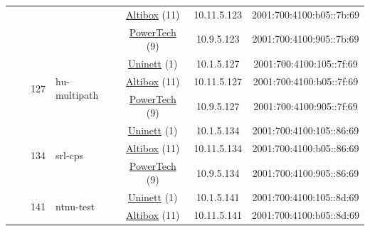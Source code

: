 \begin{small}
\begin{center}
\begin{longtable}{|c|c|c|c|c|c|c|c|}
  &  &  &  & \multicolumn{2}{|c|}{\tiny{\href{https://www.altibox.no}{Altibox} (11)}} & \tiny{10.11.5.123} & \tiny{2001:700:4100:b05::7b:69} \\* \cline{5-5}\cline{6-6}\cline{7-7}\cline{8-8}
  &  &  &  & \multicolumn{2}{|c|}{\tiny{\href{http://www.powertech.no}{PowerTech} (9)}} & \tiny{10.9.5.123} & \tiny{2001:700:4100:905::7b:69} \\* \cline{3-3}\cline{4-4}\cline{5-5}\cline{6-6}\cline{7-7}\cline{8-8}
  &  & \multirow{3}{*}{\tiny{127}} & \multicolumn{1}{|l|}{\multirow{3}{*}{\tiny{hu-multipath}}} & \multicolumn{2}{|c|}{\tiny{\href{https://www.uninett.no}{Uninett} (1)}} & \tiny{10.1.5.127} & \tiny{2001:700:4100:105::7f:69} \\* \cline{5-5}\cline{6-6}\cline{7-7}\cline{8-8}
  &  &  &  & \multicolumn{2}{|c|}{\tiny{\href{https://www.altibox.no}{Altibox} (11)}} & \tiny{10.11.5.127} & \tiny{2001:700:4100:b05::7f:69} \\* \cline{5-5}\cline{6-6}\cline{7-7}\cline{8-8}
  &  &  &  & \multicolumn{2}{|c|}{\tiny{\href{http://www.powertech.no}{PowerTech} (9)}} & \tiny{10.9.5.127} & \tiny{2001:700:4100:905::7f:69} \\* \cline{3-3}\cline{4-4}\cline{5-5}\cline{6-6}\cline{7-7}\cline{8-8}
  &  & \multirow{3}{*}{\tiny{134}} & \multicolumn{1}{|l|}{\multirow{3}{*}{\tiny{srl-cps}}} & \multicolumn{2}{|c|}{\tiny{\href{https://www.uninett.no}{Uninett} (1)}} & \tiny{10.1.5.134} & \tiny{2001:700:4100:105::86:69} \\* \cline{5-5}\cline{6-6}\cline{7-7}\cline{8-8}
  &  &  &  & \multicolumn{2}{|c|}{\tiny{\href{https://www.altibox.no}{Altibox} (11)}} & \tiny{10.11.5.134} & \tiny{2001:700:4100:b05::86:69} \\* \cline{5-5}\cline{6-6}\cline{7-7}\cline{8-8}
  &  &  &  & \multicolumn{2}{|c|}{\tiny{\href{http://www.powertech.no}{PowerTech} (9)}} & \tiny{10.9.5.134} & \tiny{2001:700:4100:905::86:69} \\* \cline{3-3}\cline{4-4}\cline{5-5}\cline{6-6}\cline{7-7}\cline{8-8}
  &  & \multirow{3}{*}{\tiny{141}} & \multicolumn{1}{|l|}{\multirow{3}{*}{\tiny{ntnu-test}}} & \multicolumn{2}{|c|}{\tiny{\href{https://www.uninett.no}{Uninett} (1)}} & \tiny{10.1.5.141} & \tiny{2001:700:4100:105::8d:69} \\* \cline{5-5}\cline{6-6}\cline{7-7}\cline{8-8}
  &  &  &  & \multicolumn{2}{|c|}{\tiny{\href{https://www.altibox.no}{Altibox} (11)}} & \tiny{10.11.5.141} & \tiny{2001:700:4100:b05::8d:69} \\* \cline{5-5}\cline{6-6}\cline{7-7}\cline{8-8}

\end{longtable}
\end{center}
\end{small}
